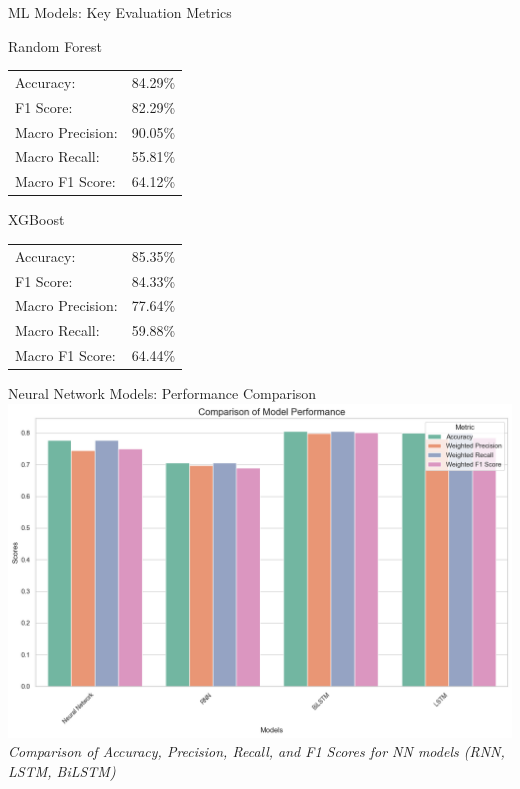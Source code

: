 \begin{frame}{ML Models: Key Evaluation Metrics}
	\centering
	\large
	\begin{minipage}{0.48\linewidth}
		\begin{block}{Random Forest}
			\begin{tabular}{ll}
				Accuracy: & 84.29\% \\
				F1 Score: & 82.29\% \\
				Macro Precision: & 90.05\% \\
				Macro Recall: & 55.81\% \\
				Macro F1 Score: & 64.12\% \\
			\end{tabular}
		\end{block}
	\end{minipage}
	\hfill
	\begin{minipage}{0.48\linewidth}
		\begin{block}{XGBoost}
			\begin{tabular}{ll}
				Accuracy: & 85.35\% \\
				F1 Score: & 84.33\% \\
				Macro Precision: & 77.64\% \\
				Macro Recall: & 59.88\% \\
				Macro F1 Score: & 64.44\% \\
			\end{tabular}
		\end{block}
	\end{minipage}
\end{frame}

\begin{frame}{Neural Network Models: Performance Comparison}
	\centering
	\includegraphics[width=0.8\linewidth]{images/paper_2/Comparision Plot}
	\vspace{1em}
	\textit{Comparison of Accuracy, Precision, Recall, and F1 Scores for NN models (RNN, LSTM, BiLSTM)}
\end{frame}

 
